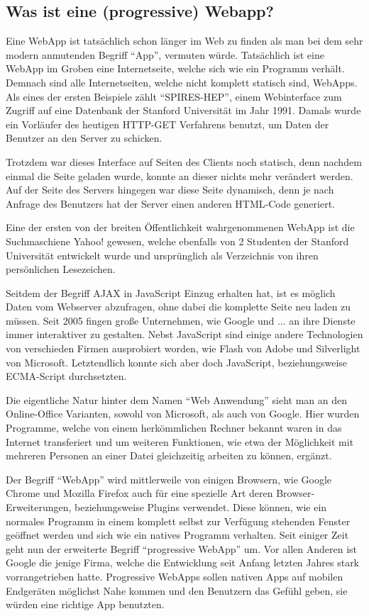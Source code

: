\documentclass[a4paper,12pt,ngerman,listof=numbered]{scrartcl}      %
\let\oldcite\cite
\renewcommand{\cite}[1]{\textsuperscript{\oldcite{#1}}}
\begin{document}
	\subsection{Was ist eine (progressive) Webapp?}
	Eine WebApp ist tatsächlich schon länger im Web zu finden als man bei dem sehr modern anmutenden Begriff ``App'', vermuten würde. Tatsächlich ist eine WebApp im Groben eine Internetseite, welche sich wie ein Programm verhält. Demnach sind alle Internetseiten, welche nicht komplett statisch sind, WebApps. Als eines der ersten Beispiele zählt ``SPIRES-HEP'', einem Webinterface zum Zugriff auf eine Datenbank der Stanford Universität im Jahr 1991. Damals wurde ein Vorläufer des heutigen HTTP-GET Verfahrens benutzt, um Daten der Benutzer an den Server zu schicken.\par
	Trotzdem war dieses Interface auf Seiten des Clients noch statisch, denn nachdem einmal die Seite geladen wurde, konnte an dieser nichts mehr verändert werden. Auf der Seite des Servers hingegen war diese Seite dynamisch, denn je nach Anfrage des Benutzers hat der Server einen anderen HTML-Code generiert.\par
	Eine der ersten von der breiten Öffentlichkeit wahrgenommenen WebApp ist die Suchmaschiene Yahoo! gewesen, welche ebenfalls von 2 Studenten der Stanford Universität entwickelt wurde und ursprünglich als Verzeichnis von ihren persönlichen Lesezeichen.\cite{webappWiki}\par
	Seitdem der Begriff AJAX in JavaScript Einzug erhalten hat, ist es möglich Daten vom Webserver abzufragen, ohne dabei die komplette Seite neu laden zu müssen. Seit 2005 fingen große Unternehmen, wie Google und ... an ihre Dienste immer interaktiver zu gestalten. Nebst JavaScript sind einige andere Technologien von verschieden Firmen ausprobiert worden, wie Flash von Adobe und Silverlight von Microsoft. Letztendlich konnte sich aber doch JavaScript, beziehungsweise ECMA-Script durchsetzten.\cite{webappWikiEN}\par
	Die eigentliche Natur hinter dem Namen ``Web Anwendung'' sieht man an den Online-Office Varianten, sowohl von Microsoft, als auch von Google. Hier wurden Programme, welche von einem herkömmlichen Rechner bekannt waren in das Internet transferiert und um weiteren Funktionen, wie etwa der Möglichkeit mit mehreren Personen an einer Datei gleichzeitig arbeiten zu können, ergänzt.\par
	Der Begriff ``WebApp'' wird mittlerweile von einigen Browsern, wie Google Chrome und Mozilla Firefox auch für eine spezielle Art deren Browser-Erweiterungen, beziehungsweise Plugins verwendet. Diese können, wie ein normales Programm in einem komplett selbst zur Verfügung stehenden Fenster geöffnet werden und sich wie ein natives Programm verhalten.
	Seit einiger Zeit geht nun der erweiterte Begriff ``progressive WebApp'' um. Vor allen Anderen ist Google die jenige Firma, welche die Entwicklung seit Anfang letzten Jahres stark vorrangetrieben hatte. Progressive WebApps sollen nativen Apps auf mobilen Endgeräten möglichst Nahe kommen und den Benutzern das Gefühl geben, sie würden eine richtige App benutzten.
	\cite{prwebappWiki}\par
\end{document}
